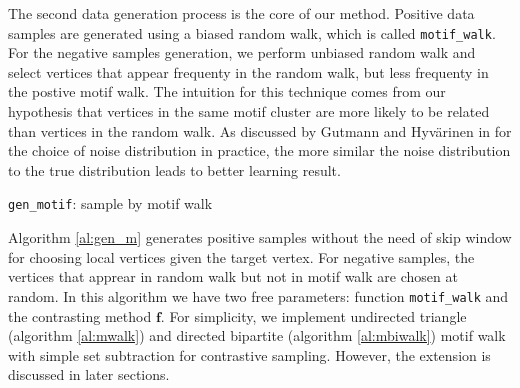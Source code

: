\documentclass{sig-alternate-05-2015}
\begin{document}
The second data generation process is the core of
our method. Positive data samples are generated
using a biased random walk, which is called 
\texttt{motif\_walk}. For the negative samples
generation, we perform unbiased random walk and
select vertices that appear frequenty in the
random walk, but less frequenty in the postive
motif walk. The intuition for this technique comes
from our hypothesis that vertices in the same motif 
cluster are more likely to be related than vertices
in the random walk. As discussed by Gutmann and 
Hyv{\"a}rinen in \cite{nce} for the choice of noise
distribution in practice, the more similar the
noise distribution to the true distribution leads
to better learning result.

\begin{algorithm}[h] \label{al:gen_m}
\caption{\texttt{gen\_motif}: sample by motif walk}
\end{algorithm}

Algorithm \ref{al:gen_m} generates positive samples
without the need of skip window for choosing local
vertices given the target vertex. For negative
samples, the vertices that apprear in random walk but
not in motif walk are chosen at random. In this algorithm
we have two free parameters: function \texttt{motif\_walk}
and the contrasting method $\boldsymbol f$. For simplicity,
we implement undirected triangle (algorithm \ref{al:mwalk}) 
and directed bipartite (algorithm \ref{al:mbiwalk})
motif walk with simple set subtraction for contrastive 
sampling. However, the extension is discussed in
later sections.
\end{document}
